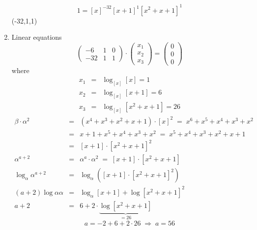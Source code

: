 \documentclass[a4paper]{scrreprt}
\begin{document}
\begin{enumerate}
        \[1=[x]^{-32}[x+1]^1[x^2+x+1]^1\]
        (-32,1,1)
    \item Linear equations
    \[\begin{pmatrix}-6&1&0\\-32&1&1\end{pmatrix}\cdot\begin{pmatrix}x_1\\x_2\\x_3\end{pmatrix}
    =\begin{pmatrix}0\\0\\0\end{pmatrix}\]
        where \begin{eqnarray*}
            x_1&=&\log_{[x]}[x]=1\\
            x_2&=&\log_{[x]}[x+1]=6\\
            x_3&=&\log_{[x]}[x^2+x+1]=26
        \end{eqnarray*}
    \begin{eqnarray*}
        \beta\cdot\alpha^2 &=& (x^4+x^3+x^2+x+1)\cdot[x]^2
                           \;=\; x^6+x^5+x^4+x^3+x^2\\
                           &=& x+1+x^5+x^4+x^3+x^2
                           \;=\; x^5+x^4+x^3+x^2+x+1\\
                           &=& [x+1]\cdot[x^2+x+1]^2\\
        \alpha^{a+2} &=& \alpha^a\cdot\alpha^2 \;=\; [x+1]\cdot[x^2+x+1]\\
        \log_\alpha\alpha^{a+2} &=& \log_\alpha([x+1]\cdot[x^2+x+1]^2)\\
        (a+2)\log\alpha\alpha &=& \log_\alpha[x+1]+\log[x^2+x+1]^2\\
        a+2 &=&  6+2\cdot\underbrace{\log[x^2+x+1]}_{=26}
    \end{eqnarray*}
    \[a=-2+6+2\cdot26\;\Rightarrow\; a=56\]
\end{enumerate}
\end{document}
